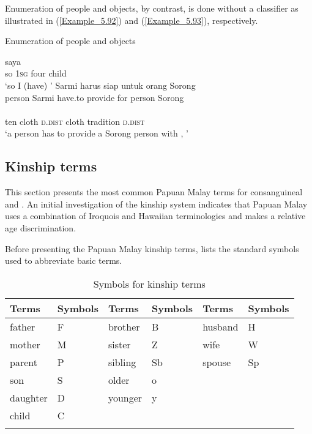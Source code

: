 Enumeration of people and objects, by contrast, is done without a classifier as illustrated in (\ref{Example_5.92}) and (\ref{Example_5.93}), respectively.


\begin{styleExampleTitle}
Enumeration of people and objects
\end{styleExampleTitle}

\ea
\label{Example_5.92}
 {saya} {} {}\\ %
 so  \textsc{1sg}  four  child\\
\glt 
‘so I (have) ’ \textstyleExampleSource{[081006-024-CvEx.0002]}
\z
\ea
\label{Example_5.93}
 {{Sarmi}} {{harus}} {{siap}} {{untuk}} {orang} {Sorong}\\ %
 {person}  {Sarmi}  {have.to}  {provide}  {for}  person  Sorong\\
 \gll  {}  {}  {}  {}  {}  {}\\
 ten  {cloth}  {\textsc{d.dist}}  {cloth}  {tradition}  {\textsc{d.dist}}\\
 ‘a  person has to provide a Sorong person with , ’ \textstyleExampleSource{[081006-029-CvEx.0012]}
\z


\subsection{Kinship terms}
\label{Para_5.2.7}
This section presents the most common Papuan Malay terms for consanguineal and . An initial investigation of the kinship system indicates that Papuan Malay uses a combination of Iroquois and Hawaiian terminologies and makes a relative age discrimination.



Before presenting the Papuan Malay kinship terms,  lists the standard symbols used to abbreviate basic terms.


\begin{table}
\caption{Symbols for kinship terms}\label{Table_5.10}


\begin{tabular}{llllll}
\lsptoprule
 Terms & Symbols & Terms & Symbols & Terms &  Symbols\\
\midrule
father & F & brother & B & husband & H\\
mother & M & sister & Z & wife & W\\
parent & P & sibling & Sb & spouse & Sp\\
son & S & older & o &  & \\
daughter & D & younger & y &  & \\
child & C &  &  &  & \\
\lspbottomrule
\end{tabular}
\end{table}

